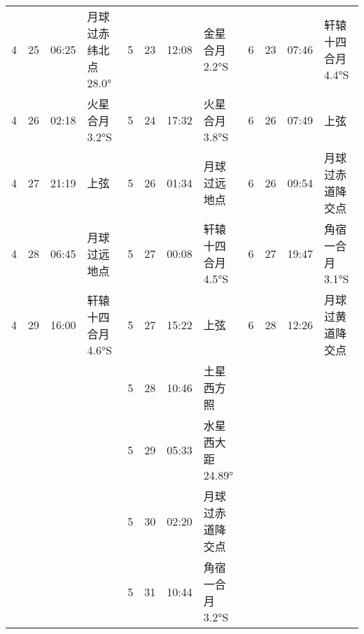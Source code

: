 \begin{tabular}{llll|llll|llll}
4 & 25 & 06:25 & 月球过赤纬北点 28.0° & 5 & 23 & 12:08 & 金星合月 2.2°S & 6 & 23 & 07:46 & 轩辕十四合月 4.4°S \tabularnewline
4 & 26 & 02:18 & 火星合月 3.2°S & 5 & 24 & 17:32 & 火星合月 3.8°S & 6 & 26 & 07:49 & 上弦 \tabularnewline
4 & 27 & 21:19 & 上弦 & 5 & 26 & 01:34 & 月球过远地点 & 6 & 26 & 09:54 & 月球过赤道降交点 \tabularnewline
4 & 28 & 06:45 & 月球过远地点 & 5 & 27 & 00:08 & 轩辕十四合月 4.5°S & 6 & 27 & 19:47 & 角宿一合月 3.1°S \tabularnewline
4 & 29 & 16:00 & 轩辕十四合月 4.6°S & 5 & 27 & 15:22 & 上弦 & 6 & 28 & 12:26 & 月球过黄道降交点 \tabularnewline
 &  &  &  & 5 & 28 & 10:46 & 土星西方照 &  &  &  &  \tabularnewline
 &  &  &  & 5 & 29 & 05:33 & 水星西大距 24.89° &  &  &  &  \tabularnewline
 &  &  &  & 5 & 30 & 02:20 & 月球过赤道降交点 &  &  &  &  \tabularnewline
 &  &  &  & 5 & 31 & 10:44 & 角宿一合月 3.2°S &  &  &  &  \tabularnewline
\hline \end{tabular}

